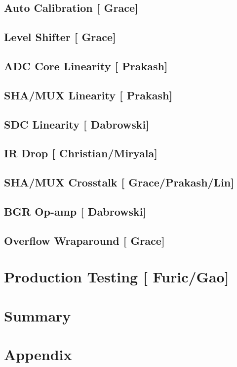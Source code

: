 \documentclass[10pt]{article}
\begin{document}
\subsection{Auto Calibration [{\color{red} Grace}] }

\subsection{Level Shifter  [{\color{red} Grace}] }

\subsection{ADC Core Linearity  [{\color{red} Prakash}] }

\subsection{SHA/MUX Linearity  [{\color{red} Prakash}] }
\subsection{SDC Linearity  [{\color{red} Dabrowski}] }

\subsection{IR Drop [{\color{red} Christian/Miryala}] }

\subsection{SHA/MUX Crosstalk [{\color{red} Grace/Prakash/Lin}] }

\subsection{BGR Op-amp	 [{\color{red} Dabrowski}] }

\subsection{Overflow Wraparound  [{\color{red} Grace}] }


\section{Production Testing   [{\color{red} Furic/Gao}] }


\section{Summary}  
%	

\newpage



\newpage
\section*{Appendix}

\end{document}
